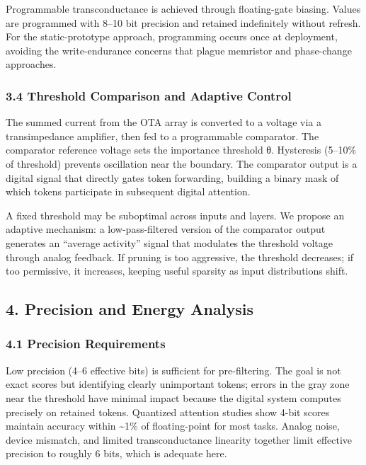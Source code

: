 Programmable transconductance is achieved through floating-gate biasing.
Values are programmed with 8--10 bit precision and retained indefinitely
without refresh. For the static-prototype approach, programming occurs
once at deployment, avoiding the write-endurance concerns that plague
memristor and phase-change approaches.

\subsubsection{3.4 Threshold Comparison and Adaptive
Control}\label{threshold-comparison-and-adaptive-control}

The summed current from the OTA array is converted to a voltage via a
transimpedance amplifier, then fed to a programmable comparator. The
comparator reference voltage sets the importance threshold θ. Hysteresis
(5--10\% of threshold) prevents oscillation near the boundary. The
comparator output is a digital signal that directly gates token
forwarding, building a binary mask of which tokens participate in
subsequent digital attention.

A fixed threshold may be suboptimal across inputs and layers. We propose
an adaptive mechanism: a low-pass-filtered version of the comparator
output generates an ``average activity'' signal that modulates the
threshold voltage through analog feedback. If pruning is too aggressive,
the threshold decreases; if too permissive, it increases, keeping useful
sparsity as input distributions shift.

\subsection{4. Precision and Energy
Analysis}\label{precision-and-energy-analysis}

\subsubsection{4.1 Precision Requirements}\label{precision-requirements}

Low precision (4--6 effective bits) is sufficient for pre-filtering. The
goal is not exact scores but identifying clearly unimportant tokens;
errors in the gray zone near the threshold have minimal impact because
the digital system computes precisely on retained tokens. Quantized
attention studies show 4-bit scores maintain accuracy within
\textasciitilde1\% of floating-point for most tasks. Analog noise,
device mismatch, and limited transconductance linearity together limit
effective precision to roughly 6 bits, which is adequate here.

